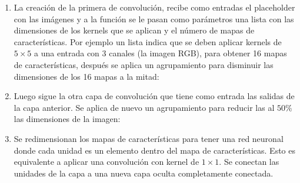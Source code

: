 \begin{enumerate}

\item La creación de la primera de convolución, recibe como entradas el placeholder
con las imágenes y a la función se le pasan como parámetros una lista con las dimensiones
de los kernels que se aplican y el número de mapas de características. Por ejemplo
un lista \sphinxcode{\sphinxupquote{{[}5, 5, 3, 16{]}}} indica que se deben aplicar kernels de $5 \times 5$ a
una entrada con 3 canales (la imagen RGB), para obtener
16 mapas de características, después se aplica un agrupamiento para disminuir las
dimensiones de los 16 mapas a la mitad:

%
\begin{sphinxVerbatim}[commandchars=\\\{\}]
   
  
\end{sphinxVerbatim}

\item Luego sigue la otra capa de convolución que tiene como entrada las salidas
de la capa anterior. Se aplica de nuevo un agrupamiento para reducir las al $50\%$ las
dimensiones de la imagen:

%
\begin{sphinxVerbatim}[commandchars=\\\{\}]
   
  
\end{sphinxVerbatim}

\item Se redimensionan los
mapas de características para tener una red neuronal donde cada unidad es un
elemento dentro del mapa de características. Esto es equivalente a aplicar
una convolución con kernel de $1 \times 1$. 
Se conectan las unidades de la capa a una nueva capa oculta
completamente conectada.

%
\begin{sphinxVerbatim}[commandchars=\\\{\}]
   \PYG{p}{[}     \PYG{p}{]}
   
\end{sphinxVerbatim}


\end{enumerate}
